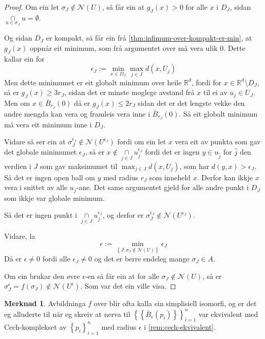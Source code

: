 \documentclass[a4paper, 12pt, norsk]{article}
\theoremstyle{plain}
\theoremstyle{definition}
\newtheorem{remark}[theorem]{Merknad}
\newcommand{\Rb}{\mathbb{R}}
\newcommand{\Nc}{\mathcal{N}}
\newcommand{\intersect}{ \mathop{\cap}\limits }
\newcommand{\set}[1]{ \left\{ #1 \right\} } %
\begin{document}
\begin{proof}
	Om ein let \( \sigma_J \not\in \Nc(U) \), så får ein at \( g_J(x) > 0 \) for alle \( x \) i \( D_J \), sidan \( \intersect_{u \in \sigma_J} u = \emptyset \).

	Og sidan \( D_J \) er kompakt, så får ein frå \autoref{thm:infimum-over-kompakt-er-min}, at \( g_J(x) \) oppnår eit minimum, som frå argumentet over må vera ulik \( 0 \). Dette kallar ein for
	\[
		\epsilon_J := \min_{x \in D_J} \max_{j \in J} d(x, U_j) 
	\]
	Men dette minimumet er eit globalt minimum over heile \( \Rb^d \), fordi for \( x \in \Rb^d \setminus D_J \), så er \( g_J(x) \geq 3r_J \), sidan det er minste moglege avstand frå \( x \) til ei av \( u_j \in U_J \). Men om \( x \in \bar{B}_{r_J}(0) \) då er \( g_J(x) \leq 2r_J \) sidan det er det lengste vekke den andre mengda kan vera og framleis vera inne i \( \bar{B}_{r_J}(0) \). Så eit globalt minimum må vera eit minimum inne i \( D_J \).

	Vidare så ser ein at \( \sigma_J^{\epsilon_J} \not\in \Nc(U^{\epsilon_J}) \) fordi om ein let \( x \) vera eit av punkta som gav det globale minimumet \( \epsilon_J \), så er \( x \not\in \intersect_{j \in J} u_j^{\epsilon_J} \) fordi det er ingen \( y \in  u_{\hat{j}} \) for \( \hat{j} \) den verdien i \( J \) som gav maksimumet til \( \max_{j \in J} d(x, U_j) \), som har \( d(y, x) > \epsilon_J \). Så det er ingen open ball om \( y \) med radius \( r_J \) som inneheld \( x \). Derfor kan ikkje \( x \) vera i snittet av alle \( u_j \)-ane. Det same argumentet gjeld for alle andre punkt i \( D_J \) som ikkje var globale minimum.
	
	Så det er ingen punkt i \( \intersect_{j \in J} u_j^{\epsilon_J} \), og derfor er \( \sigma_J^{\epsilon_J} \not\in \Nc(U^{\epsilon_J}) \).

	Vidare, la
	\[
		\epsilon := \min_{\set{J : \sigma_J \not\in \Nc(U)}} \epsilon_J
	\]
	Då er \( \epsilon \neq 0 \) fordi alle \( \epsilon_J \neq 0 \) og det er berre endeleg mange \( \sigma_J \in A \).

	Om ein brukar den øvre \( \epsilon \)-en så får ein at for alle \( \sigma_J \not\in \Nc(U) \), så er \( \sigma_J^{\epsilon}=f(\sigma_J) \not\in \Nc(U^{\epsilon}) \). Som var det ein ville visa.

\end{proof}

\begin{remark}
	Avbildninga \( f \) over blir ofta kalla ein simplisiell isomorfi, og er det eg alluderte til når eg skreiv at nerva til \( \set{\set{\bar{B}_\epsilon(p_i)}}_{i=1}^n \) var ekvivalent med Cech-komplekset av \( \set{p_i}_{i=1}^n \) med radius \( \epsilon \) i \autoref{rem:cech-ekvivalent}.
\end{remark}
\end{document}
